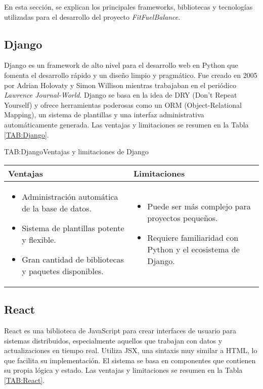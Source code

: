 En esta sección, se explican los principales frameworks, bibliotecas y tecnologías utilizadas para el desarrollo del proyecto \textit{FitFuelBalance}.

\subsection{Django}

Django es un framework de alto nivel para el desarrollo web en Python que fomenta el desarrollo rápido y un diseño limpio y pragmático. Fue creado en 2005 por Adrian Holovaty y Simon Willison mientras trabajaban en el periódico \textit{Lawrence Journal-World}. Django se basa en la idea de DRY (Don’t Repeat Yourself) y ofrece herramientas poderosas como un ORM (Object-Relational Mapping), un sistema de plantillas y una interfaz administrativa automáticamente generada. Las ventajas y limitaciones se resumen en la Tabla \ref{TAB:Django}.

\begin{table}[Django]{TAB:Django}{Ventajas y limitaciones de Django}
  \begin{tabular}{|p{7cm}|p{7cm}|}
    \hline
    \textbf{Ventajas} & \textbf{Limitaciones} \\
    \hline
    \begin{itemize}
      \item Administración automática de la base de datos.
      \item Sistema de plantillas potente y flexible.
      \item Gran cantidad de bibliotecas y paquetes disponibles.
    \end{itemize} &
    \begin{itemize}
      \item Puede ser más complejo para proyectos pequeños.
      \item Requiere familiaridad con Python y el ecosistema de Django.
    \end{itemize} \\
    \hline
  \end{tabular}
\end{table}

\subsection{React}

React es una biblioteca de JavaScript para crear interfaces de usuario para sistemas distribuidos, especialmente aquellos que trabajan con datos y actualizaciones en tiempo real. Utiliza JSX, una sintaxis muy similar a HTML, lo que facilita su implementación. El sistema se basa en componentes que contienen su propia lógica y estado. Las ventajas y limitaciones se resumen en la Tabla \ref{TAB:React}.

